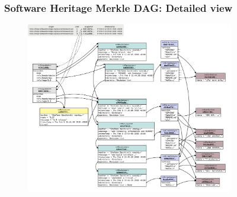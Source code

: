 \documentclass[aspectratio=169,xcolor=table]{beamer}
\begin{document}
    \begin{frame}
        \frametitle{Software Heritage Merkle DAG: Detailed view}
        \begin{figure}
            \centering
            \includegraphics[height=7.5cm]{../img/swh-merkle-dag}
        \end{figure}
    \end{frame}


\end{document}
